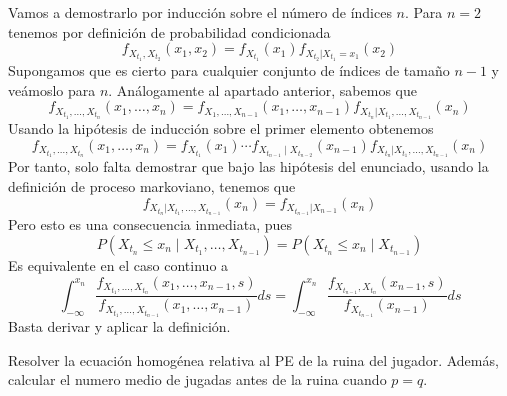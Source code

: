 \documentclass[twoside]{article}
\begin{document}
\begin{solucion}
Vamos a demostrarlo por inducción sobre el número de índices $n$. Para $n=2$ tenemos por definición de probabilidad condicionada
$$
f_{X_{t_1},X_{t_2}}(x_1,x_2) = f_{X_{t_1}}(x_1)f_{X_{t_2}|X_{t_1}=x_1}(x_2)
$$
Supongamos que es cierto para cualquier conjunto de índices de tamaño $n-1$ y veámoslo para $n$. Análogamente al apartado anterior, sabemos que
$$
f_{X_{t_1},\dotsc,X_{t_n}}(x_1,\dotsc,x_n) = f_{X_1,\dotsc,X_{n-1}}(x_1,\dotsc,x_{n-1}) f_{X_{t_n}|X_{t_1},\dotsc, X_{t_{n-1}}}(x_n) 
$$
Usando la hipótesis de inducción sobre el primer elemento obtenemos
$$
f_{X_{t_1},\dotsc,X_{t_n}}(x_1,\dotsc,x_n) = f_{X_{t_1}}(x_1)\cdots f_{X_{t_{n-1}}\mid X_{t_{n-2}}}(x_{n-1}) f_{X_{t_n}|X_{t_1},\dotsc, X_{t_{n-1}}}(x_n) 
$$
Por tanto, solo falta demostrar que bajo las hipótesis del enunciado, usando la definición de proceso markoviano, tenemos que
$$
f_{X_{t_n}|X_{t_1},\dotsc, X_{t_{n-1}}}(x_n) = f_{X_{t_{n-1}}|X_{n-1}}(x_n)
$$
Pero esto es una consecuencia inmediata, pues
$$
P(X_{t_n} \leq x_n \mid X_{t_1},\dotsc,X_{t_{n-1}}) = P(X_{t_n} \leq x_n \mid X_{t_{n-1}})
$$
Es equivalente en el caso continuo a
$$
\int_{-\infty}^{x_n}\frac{f_{X_{t_1},\dotsc,X_{t_n}}(x_1,\dotsc,x_{n-1},s)}{f_{X_{t_1},\dotsc,X_{t_{n-1}}}(x_1,\dotsc,x_{n-1})}ds =  \int_{-\infty}^{x_n}\frac{f_{X_{t_{n-1}},X_{t_n}}(x_{n-1},s)}{f_{X_{t_{n-1}}}(x_{n-1})}ds 
$$
Basta derivar y aplicar la definición.
\end{solucion}

\newpage


\begin{ejercicio}{3}
Resolver la ecuación homogénea relativa al PE de la ruina del jugador. Además, calcular el numero medio de jugadas antes de la ruina cuando $p = q$.

\end{ejercicio}
\end{document}
